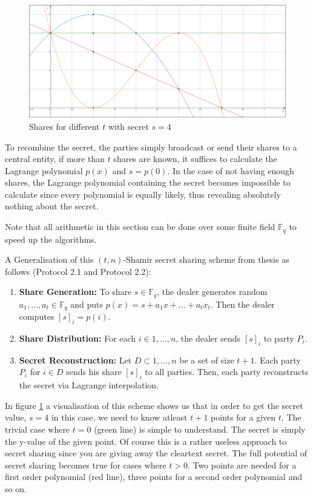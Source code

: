 \begin{figure}
  \includegraphics[width=\linewidth]{plots/secretsharing_big.png}
  \caption{Shares for different $t$ with secret $s=4$}
  \label{fig:secretsharing}
\end{figure}

To recombine the secret, the parties simply broadcast or send their shares to a central entity, if more than $t$ shares are known, it suffices to calculate the Lagrange polynomial $p(x)$ and $s=p(0)$. In the case of not having enough shares, the Lagrange polynomial containing the secret becomes impossible to calculate since every polynomial is equally likely, thus revealing absolutely nothing about the secret.

Note that all arithmetic in this section can be done over some finite field $\mathbb{F}_q$ to speed up the algorithms.

A Generalisation of this $(t,n)$-Shamir secret sharing scheme from thesis \cite{de2012design} as follows (Protocol 2.1 and Protocol 2.2):
\begin{enumerate}
  \item \textbf{Share Generation:} To share $s \in \mathbb{F}_q$, the dealer generates random $a_1, ..., a_t \in \mathbb{F}_q$ and puts $p(x) = s + a_1x + ... + a_tx_t$. Then the dealer computes $[s]_i = p(i)$.
  \item \textbf{Share Distribution:} For each $i \in {1, ..., n}$, the dealer sends $[s]_i$ to party $P_i$.
  \item \textbf{Secret Reconstruction:} Let $D \subset {1, ..., n}$ be a set of size $t + 1$. Each party $P_i$ for $i \in D$ sends his share $[s]_i$ to all parties. Then, each party reconstructs the secret via Lagrange interpolation.
\end{enumerate}
In figure \ref{fig:secretsharing} a visualisation of this scheme shows us that in order to get the secret value, $s=4$ in this case, we need to know atleast $t+1$ points for a given $t$. The trivial case where $t=0$ (green line) is simple to understand. The secret is simply the y-value of the given point. Of course this is a rather useless approach to secret sharing since you are giving away the cleartext secret. The full potential of secret sharing becomes true for cases where $t>0$. Two points are needed for a first order polynomial (red line), three points for a second order polynomial and so on.

